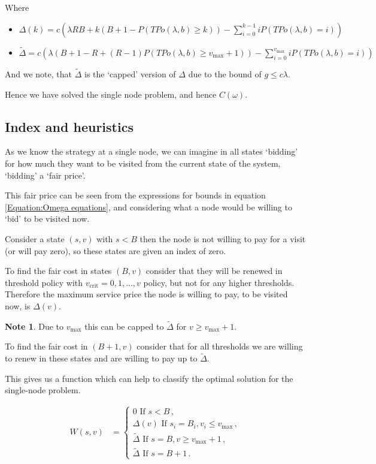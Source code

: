 \documentclass[a4paper,10pt]{article}
\theoremstyle{definition}
\theoremstyle{definition}
\theoremstyle{remark}
\theoremstyle{definition}
\newtheorem*{note}{Note}
\begin{document}
Where
\begin{itemize}
\item $\Delta(k)=c (\lambda R B +k(B+1-P(TPo(\lambda,b) \geq k))-\sum\limits_{i=0}^{k-1} i P(TPo(\lambda,b)=i))$
\item $\widetilde{\Delta}= c  ( \lambda (B+1-R + (R-1) P(TPo(\lambda,b) \geq v_{\text{max}}+1)) - \sum\limits_{i=0}^{v_{\text{max}}} i P(TPo(\lambda,b)=i) )$
\end{itemize}
And we note, that $\widetilde{\Delta}$ is the `capped' version of $\Delta$ due to the bound of $g \leq c \lambda$.

Hence we have solved the single node problem, and hence $C(\omega)$.

\subsection{Index and heuristics}
As we know the strategy at a single node, we can imagine in all states `bidding' for how much they want to be visited from the current state of the system, `bidding' a `fair price'.

This fair price can be seen from the expressions for bounds in equation \ref{Equation:Omega equations}, and considering what a node would be willing to `bid' to be visited now.

Consider a state $(s,v)$ with $s< B$ then the node is not willing to pay for a visit (or will pay zero), so these states are given an index of zero.

To find the fair cost in states $(B,v)$ consider that they will be renewed in threshold policy with $v_{\text{crit}}=0,1,...,v$ policy, but not for any higher thresholds. Therefore the maximum service price the node is willing to pay, to be visited now, is $\Delta(v)$.

\begin{note}
Due to $v_{\text{max}}$ this can be capped to $\widetilde{\Delta}$ for $v \geq v_{\text{max}}+1$.
\end{note} 

To find the fair cost in $(B+1,v)$ consider that for all thresholds we are willing to renew  in these states and are willing to pay up to $\widetilde{\Delta}$.

This gives us a function which can help to classify the optimal solution for the single-node problem.

\begin{align*}
W(s,v)&=\begin{cases}
0 \text{ If } s<B \, , \\
\Delta(v) \text{ If } s_{i}=B_{i} , v_{i} \leq v_{\text{max}} \, , \\
\widetilde{\Delta} \text{ If } s=B , v \geq v_{\text{max}}+1 \, , \\
\widetilde{\Delta} \text{ If } s=B+1 \, .
\end{cases}
\end{align*}
\end{document}
